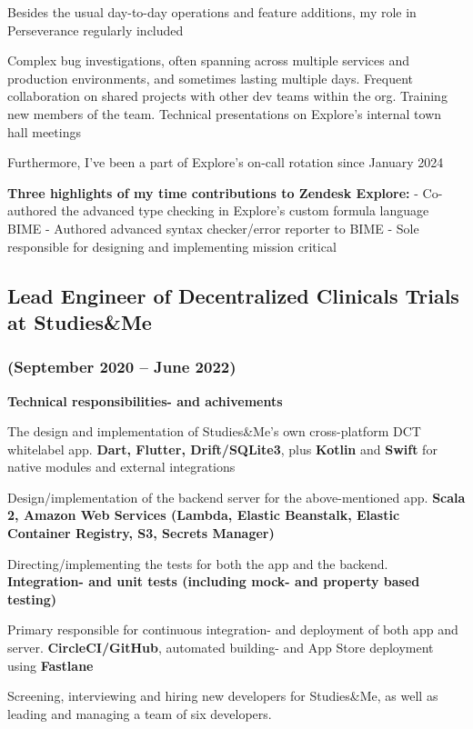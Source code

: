 \documentclass[10pt, a4paper]{article}
\newcommand{\sme}{Studies\&Me}
\begin{document}
Besides the usual day-to-day operations and feature additions, my role in Perseverance regularly included 
\begin{outline}
 \1 Complex bug investigations, often spanning across multiple services and production environments, and sometimes lasting multiple days.
 \1 Frequent collaboration on shared projects with other dev teams within the org.
 \1 Training new members of the team.
 \1 Technical presentations on Explore's internal town hall meetings
\end{outline}
Furthermore, I've been a part of Explore's on-call rotation since January 2024

\textbf{Three highlights of my time contributions to Zendesk Explore:}
- Co-authored the advanced type checking in Explore's custom formula language BIME
- Authored advanced syntax checker/error reporter to BIME
- Sole responsible for designing and implementing  mission critical 

\subsection*{Lead Engineer of Decentralized Clinicals Trials at \sme}
\subsubsection*{{\normalfont(September 2020 -- June 2022)}}
\textbf{Technical responsibilities- and achivements}
\begin{outline}
  \1 The design and implementation of \sme's own cross-platform DCT whitelabel app.\newline
    {\footnotesize \textbf{Dart, Flutter, Drift/SQLite3}, plus \textbf{Kotlin} and \textbf{Swift} for native modules and external integrations}

  \1 Design/implementation of the backend server for the above-mentioned app.\newline
  {\footnotesize \textbf{Scala 2, Amazon Web Services (Lambda, Elastic Beanstalk, Elastic Container Registry, S3, Secrets Manager)}}

  \1 Directing/implementing the tests for both the app and the backend.\newline
    {\footnotesize \textbf{Integration- and unit tests (including mock- and property based testing)}}

  \1 Primary responsible for continuous integration- and deployment of both app and server.\newline
    {\footnotesize \textbf{CircleCI/GitHub}, automated building- and App Store deployment using \textbf{Fastlane}}

  \1 Screening, interviewing and hiring new developers for \sme, as well as leading and managing a team of six developers.
\end{outline}
\end{document}
